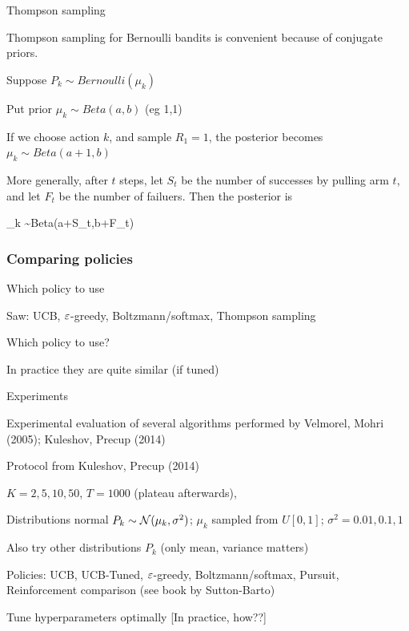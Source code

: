 \documentclass[english]{article}
\begin{document}
\item {Thompson sampling}
\bitem 
\item Thompson sampling for Bernoulli bandits is convenient because of conjugate priors. 
\item Suppose $P_k \sim Bernoulli(\mu_k)$
\item Put prior $\mu_k \sim Beta(a,b)$ (eg 1,1)
\item If we choose action $k$, and sample $R_1=1$, the posterior becomes  $\mu_k \sim Beta(a+1,b)$
\item More generally, after $t$ steps, let $S_t$ be the number of successes by pulling arm $t$, and let $F_t$ be the number of failuers. Then the posterior is

\beqs\mu_k \sim Beta(a+S_t,b+F_t)\eeqs
\eitem

\eenum

\subsubsection{Comparing policies}

\benum

\item {Which policy to use}
\bitem
\item Saw: UCB, $\varepsilon$-greedy, Boltzmann/softmax, Thompson sampling
\item Which policy to use?
\item In practice they are quite similar (if tuned)
\eitem



\item {Experiments}
\bitem
\item Experimental evaluation of several algorithms performed by Velmorel, Mohri (2005); Kuleshov, Precup (2014)
\item Protocol from Kuleshov, Precup (2014)
\bitem
\item $K=2,5,10,50$, $T=1000$ (plateau afterwards),
\item Distributions normal $P_k \sim \mathcal{N}(\mu_k,\sigma^2)$; $\mu_k$ sampled from $U[0,1]$; $\sigma^2 = 0.01,0.1,1$
\item Also try other distributions $P_k$ (only mean, variance matters)
\item Policies: UCB, UCB-Tuned, $\varepsilon$-greedy, Boltzmann/softmax, Pursuit, Reinforcement comparison (see book by Sutton-Barto)
\item Tune hyperparameters optimally [In practice, how??]
\eitem
\eitem
\end{document}
